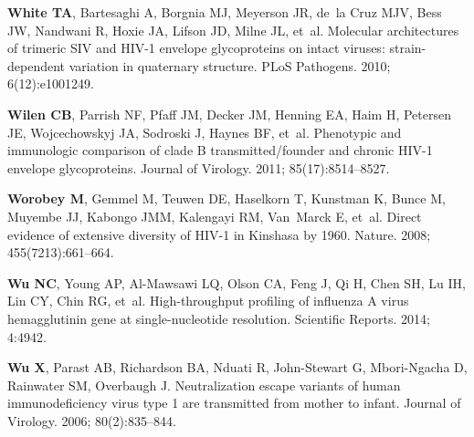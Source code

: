 \documentclass[9pt]{elife}
\begin{document}
\begin{thebibliography}{114}
\textbf{\color{eLifeMediumGrey} White TA}, Bartesaghi A, Borgnia MJ, Meyerson
  JR, de~la Cruz MJV, Bess JW, Nandwani R, Hoxie JA, Lifson JD, Milne JL,
  et~al.
\newblock Molecular architectures of trimeric SIV and HIV-1 envelope
  glycoproteins on intact viruses: strain-dependent variation in quaternary
  structure.
\newblock PLoS Pathogens.  2010; 6(12):e1001249.

\textbf{\color{eLifeMediumGrey} Wilen CB}, Parrish NF, Pfaff JM, Decker JM,
  Henning EA, Haim H, Petersen JE, Wojcechowskyj JA, Sodroski J, Haynes BF,
  et~al.
\newblock Phenotypic and immunologic comparison of clade {B}
  transmitted/founder and chronic {HIV-1} envelope glycoproteins.
\newblock Journal of Virology.  2011; 85(17):8514--8527.

\textbf{\color{eLifeMediumGrey} Worobey M}, Gemmel M, Teuwen DE, Haselkorn T,
  Kunstman K, Bunce M, Muyembe JJ, Kabongo JMM, Kalengayi RM, Van~Marck E,
  et~al.
\newblock Direct evidence of extensive diversity of {HIV-1} in {Kinshasa} by
  1960.
\newblock Nature.  2008; 455(7213):661--664.

\textbf{\color{eLifeMediumGrey} Wu NC}, Young AP, Al-Mawsawi LQ, Olson CA, Feng
  J, Qi H, Chen SH, Lu IH, Lin CY, Chin RG, et~al.
\newblock High-throughput profiling of influenza A virus hemagglutinin gene at
  single-nucleotide resolution.
\newblock Scientific Reports.  2014; 4:4942.

\textbf{\color{eLifeMediumGrey} Wu X}, Parast AB, Richardson BA, Nduati R,
  John-Stewart G, Mbori-Ngacha D, Rainwater SM, Overbaugh J.
\newblock Neutralization escape variants of human immunodeficiency virus type 1
  are transmitted from mother to infant.
\newblock Journal of Virology.  2006; 80(2):835--844.


\end{thebibliography}
\end{document}
